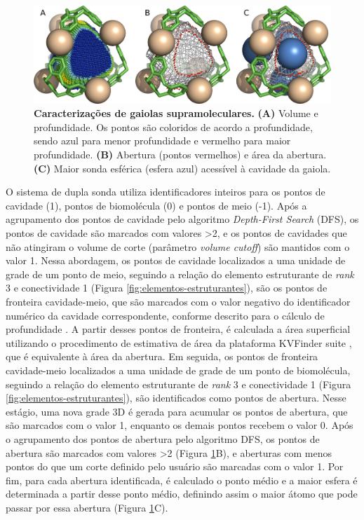 \documentclass[Portugues]{phdquali}
\begin{document}
\begin{figure}[htb]
  \centering
  \includegraphics[scale=1.2]{images/cage-characterization.png}
  \caption[Caracterizações de gaiolas supramoleculares]{\textbf{Caracterizações de gaiolas supramoleculares.} \textbf{(A)} Volume e profundidade. Os pontos são coloridos de acordo a profundidade, sendo azul para menor profundidade e vermelho para maior profundidade. \textbf{(B)} Abertura (pontos vermelhos) e área da abertura. \textbf{(C)} Maior sonda esférica (esfera azul) acessível à cavidade da gaiola.}
  \label{fig:cage-characterization}
\end{figure}

O sistema de dupla sonda utiliza identificadores inteiros para os pontos de cavidade (1), pontos de biomolécula (0) e pontos de meio (-1). Após a agrupamento dos pontos de cavidade pelo algoritmo \textit{Depth-First Search} (DFS), os pontos de cavidade são marcados com valores >2, e os pontos de cavidades que não atingiram o volume de corte (parâmetro \textit{volume cutoff}) são mantidos com o valor 1. Nessa abordagem, os pontos de cavidade localizados a uma unidade de grade de um ponto de meio, seguindo a relação do elemento estruturante de \textit{rank} 3 e conectividade 1 (Figura \ref{fig:elementos-estruturantes}), são os pontos de fronteira cavidade-meio, que são marcados com o valor negativo do identificador numérico da cavidade correspondente, conforme descrito para o cálculo de profundidade \cite{guerra2019,guerra2021}. A partir desses pontos de fronteira, é calculada a área superficial utilizando o procedimento de estimativa de área da plataforma KVFinder suite \cite{guerra2019,guerra2020}, que é equivalente à área da abertura. Em seguida, os pontos de fronteira cavidade-meio localizados a uma unidade de grade de um ponto de biomolécula, seguindo a relação do elemento estruturante de \textit{rank} 3 e conectividade 1 (Figura \ref{fig:elementos-estruturantes}), são identificados como pontos de abertura. Nesse estágio, uma nova grade 3D é gerada para acumular os pontos de abertura, que são marcados com o valor 1, enquanto os demais pontos recebem o valor 0. Após o agrupamento dos pontos de abertura pelo algoritmo DFS, os pontos de abertura são marcados com valores >2 (Figura \ref{fig:cage-characterization}B), e aberturas com menos pontos do que um corte definido pelo usuário são marcadas com o valor 1. Por fim, para cada abertura identificada, é calculado o ponto médio e a maior esfera é determinada a partir desse ponto médio, definindo assim o maior átomo que pode passar por essa abertura (Figura \ref{fig:cage-characterization}C).
\end{document}
